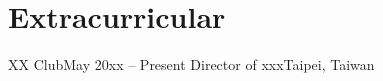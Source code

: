 \section{Extracurricular}
\resumeSubHeadingListStart

    \resumeSubheading
    {XX Club}{May 20xx -- Present}
    {Director of xxx}{Taipei, Taiwan}
    \resumeItemListStart
    \resumeItemListEnd
    
\resumeSubHeadingListEnd
